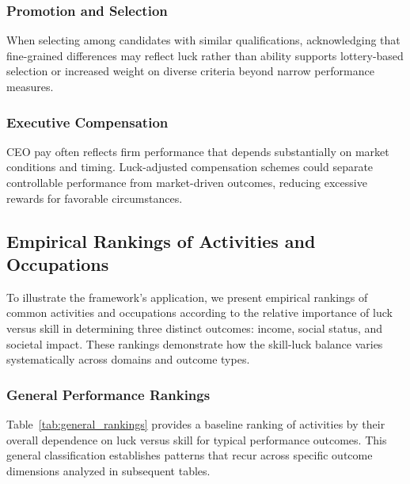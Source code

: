 \subsubsection{Promotion and Selection}

When selecting among candidates with similar qualifications, acknowledging
that fine-grained differences may reflect luck rather than ability supports
lottery-based selection or increased weight on diverse criteria beyond narrow
performance measures.

\subsubsection{Executive Compensation}

CEO pay often reflects firm performance that depends substantially on
market conditions and timing. Luck-adjusted compensation schemes could separate
controllable performance from market-driven outcomes, reducing excessive
rewards for favorable circumstances.

\subsection{Empirical Rankings of Activities and Occupations}

To illustrate the framework's application, we present empirical rankings
of common activities and occupations according to the relative
importance of luck versus skill in determining three distinct outcomes: income,
social status, and societal impact. These rankings demonstrate how the
skill-luck balance varies systematically across domains and outcome
types.

\subsubsection{General Performance Rankings}

Table~\ref{tab:general_rankings} provides a baseline ranking of activities
by their overall dependence on luck versus skill for typical performance
outcomes. This general classification establishes patterns that recur
across specific outcome dimensions analyzed in subsequent tables.

